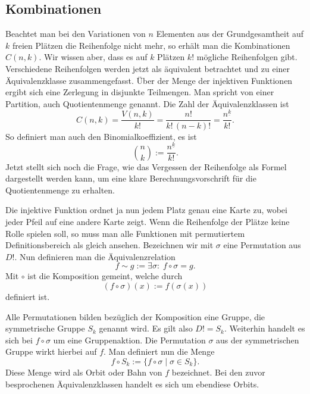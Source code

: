 \documentclass[a4paper,12pt,fleqn,twoside]{article}
\begin{document}
\subsection{Kombinationen}
Beachtet man bei den Variationen von $n$ Elementen aus der
Grundgesamtheit auf $k$ freien Plätzen die Reihenfolge nicht mehr,
so erhält man die Kombinationen $C(n,k)$. Wir wissen aber, dass
es auf $k$ Plätzen $k!$ mögliche Reihenfolgen gibt. Verschiedene
Reihenfolgen werden jetzt als äquivalent betrachtet und zu
einer Äquivalenzklasse zusammengefasst. Über der Menge der
injektiven Funktionen ergibt sich eine Zerlegung in disjunkte
Teilmengen. Man spricht von einer Partition, auch Quotientenmenge
genannt. Die Zahl der Äquivalenzklassen ist
\begin{equation}
C(n,k) = \frac{V(n,k)}{k!} = \frac{n!}{k!\,(n-k)!}
= \frac{n^{\underline k}}{k!}.
\end{equation}
So definiert man auch den Binomialkoeffizient, es ist
\begin{equation}
\binom{n}{k} := \frac{n^{\underline k}}{k!}.
\end{equation}
Jetzt stellt sich noch die Frage, wie das Vergessen der Reihenfolge
als Formel dargestellt werden kann, um eine klare
Berechnungsvorschrift für die Quotientenmenge zu erhalten.

Die injektive Funktion ordnet ja nun jedem Platz genau eine Karte
zu, wobei jeder Pfeil auf eine andere Karte zeigt. Wenn die
Reihenfolge der Plätze keine Rolle spielen soll, so muss man
alle Funktionen mit permutiertem Definitionsbereich als gleich
ansehen. Bezeichnen wir mit $\sigma$ eine Permutation
aus $D!$. Nun definieren man die Äquivalenzrelation
\begin{equation}
f\sim g  := \exists \sigma{:}\; f\circ\sigma = g.
\end{equation}
Mit $\circ$ ist die Komposition gemeint, welche durch
\begin{equation}
(f\circ \sigma)(x) := f(\sigma(x))
\end{equation}
definiert ist.

Alle Permutationen bilden bezüglich der Komposition eine Gruppe,
die symmetrische Gruppe $S_k$ genannt wird. Es gilt also
$D!=S_k$. Weiterhin handelt es sich bei $f\circ\sigma$ um eine
Gruppenaktion. Die Permutation $\sigma$ aus der symmetrischen
Gruppe wirkt hierbei auf $f$. Man definiert nun die Menge
\[f\circ S_k := \{f\circ\sigma\;|\;\sigma\in S_k\}.\]
Diese Menge wird als Orbit oder Bahn von $f$ bezeichnet.
Bei den zuvor besprochenen Äquivalenzklassen handelt es sich
um ebendiese Orbits.
\end{document}
